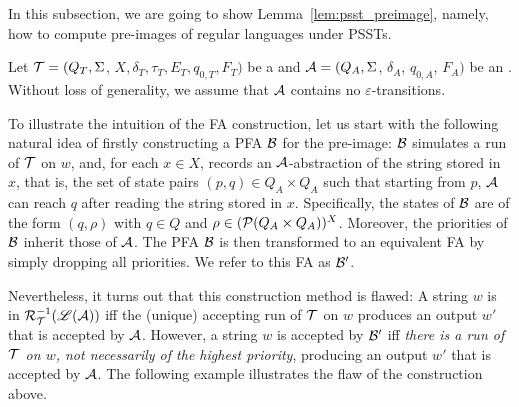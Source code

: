 In this subsection, we are going to show Lemma~\ref{lem:psst_preimage}, namely, how to compute pre-images of regular languages under PSSTs.

 
Let $\mathcal{T} = (Q_T, \Sigma$, $X, \delta_T, \tau_T, E_T,  q_{0, T}, F_T)$ be a \PSST{}  and $\mathcal{A}
  = (Q_A, \Sigma$, $\delta_A$, $q_{0, A}$, $F_A)$ be an \FA{}. Without loss of generality, we assume that $\mathcal{A}$ contains no $\varepsilon$-transitions. 

To illustrate the intuition of the FA construction, let us start with the following natural idea of firstly constructing a PFA $\mathcal{B}$ for the pre-image: $\mathcal{B}$ simulates a run of $\mathcal{T}$ on $w$, and, for each $x \in X$, records an $\mathcal{A}$-abstraction of the string stored in $x$, that is, the set of state pairs $(p, q) \in Q_A \times Q_A$ such that starting from $p$, $\mathcal{A}$ can reach $q$ after reading the string stored in $x$. Specifically, the states of $\mathcal{B}$ are of the form $(q, \rho)$ with $q \in Q$ and $\rho \in (\mathcal{P}(Q_A \times Q_A ))^{X}$. Moreover, the priorities of $\mathcal{B}$ inherit those of $\mathcal{A}$. The PFA $\mathcal{B}$ is then transformed to an equivalent FA by simply dropping all priorities. We refer to this FA as $\mathcal{B}'$.

Nevertheless, it turns out that this construction method is flawed: A string $w$ is in $\mathcal{R}^{-1}_{\mathcal{T}}(\mathscr{L}(\mathcal{A}))$ iff the (unique) accepting run of $\mathcal{T}$ on $w$ produces an output $w'$ that is accepted by $\mathcal{A}$. However, a string $w$ is accepted by $\mathcal{B}'$ iff \emph{there is a run of $\mathcal{T}$ on $w$, not necessarily of the highest priority}, producing an output $w'$ that is accepted by $\mathcal{A}$. The following example illustrates the flaw of the construction above.

